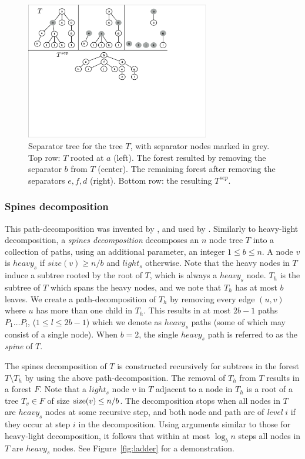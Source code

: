 				\begin{figure}[!ht]
				\centering
				\includegraphics[width=80mm]{./Figures/Separator.pdf}
				\caption{Separator tree  for  the tree  $T$, with separator nodes marked  in grey. Top row:  $T$ rooted at $a$ (left). The forest resulted by removing the separator $b$ from  $T$ (center).  The remaining  forest after removing the  separators $e,f,d$ (right). Bottom row: the resulting $T^{sep}$. }
				\label{fig:separator}
			\end{figure}
			

 
\subsubsection{Spines decomposition}\label{tec:Splines}
This path-decomposition was invented by , and used by .
Similarly to heavy-light decomposition, a \emph{spines decomposition}  decomposes an $n$ node tree $T$  into  a collection of paths, using an additional parameter, an integer $1 \leq b \leq n$.
A node $v$ is $heavy_{s}$ if $size(v) \geq n/b$ and $light_{s}$ otherwise.
Note that the heavy nodes in $T$ induce a subtree rooted by the root of $T$, which is always  a $heavy_{s}$ node.
$T_h$ is the subtree of $T$ which spans the heavy nodes, and we note that  $T_h$ has at most $b$ leaves.
We  create a path-decomposition of $T_h$  by removing  every edge $(u,v)$ where $u$ has more than one child in $T_h$.
 This results in at most  $2b-1$ paths  $P_1 \dots P_l$, ($1 \leq l \leq 2b-1$) which  we denote as  $heavy_{s}$ paths (some of which may consist of a single node). When $b=2$, the  single $heavy_{s}$  path is referred  to  as the \emph{ spine} of $T$.

The spines decomposition of $T$ is  constructed recursively for subtrees in the forest $T \setminus T_h$ by using the above path-decomposition. 
The removal of $T_h$ from $T$ results in a forest $F$.
Note that a $light_{s}$ node $v$ in $T$ adjacent to a node in $T_h$ is  a root of a tree $T_v \in F$ of size $\operatorname{size}(v) \leq n/b$.
The decomposition stops when all nodes in $T$ are  $heavy_{s}$ nodes at some recursive step, and both node and path are of  \emph{level} $i$ if they occur at step $i$ in the decomposition.
Using  arguments similar to those for heavy-light decomposition, it follows that within at most $\log_{b} n$  steps all nodes in $T$ are $heavy_{s}$ nodes. 
See Figure~\ref{fig:ladder} for a demonstration.

